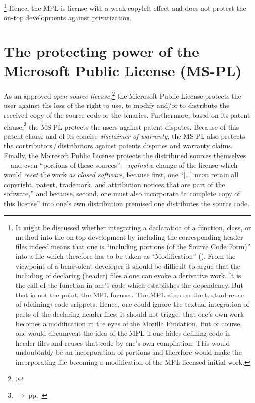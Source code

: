  \footnote{It might be discussed whether integrating a declaration of a
  function, class, or method into the on-top development by including the
  corresponding header files indeed means that one is \enquote{including
  portions (of the Source Code Form)} into a file which therefore has to be
  taken as \enquote{Modification} (\cite[cf.][\nopage
  wp.\ §1.4]{Mpl11MozFoundation2013a}). From the viewpoint of a benevolent
  developer it should be difficult to argue that the including of declaring
  (header) files alone can evoke a derivative work. It is the call of the
  function in one's code which establishes the dependency. But that is not the 
  point, the MPL focuses. The MPL aims on the textual reuse of (defining) code
  snippets. Hence, one could ignore the textual integration of parts of the
  declaring header files: it should not trigger that one's own work becomes a
  modification in the eyes of the Mozilla Findation. But of course, one would
  circumvent the idea of the MPL if one hides defining code in header files and
  reuses that code by one's own compilation. This would undoubtably be an
  incorporation of portions and therefore would make the incorporating file
  becoming a modification of the MPL licensed initial work.} 
Hence, the MPL is license with a weak copyleft effect and does not protect the
on-top developments against privatization.

\section{\texorpdfstring{The protecting power of the}{The} Microsoft Public License (MS-PL)}

As an approved \emph{open source license,}\footcite[cf.][\nopage wp]{OSI2012b}
the Microsoft Public License protects the user against the loss of the right to
use, to modify and/or to distribute the received copy of the source code or the
binaries. Furthermore, based on its patent
clause,\footnote{$\rightarrow$ \oslic{} pp.\ } the
MS-PL protects the users against patent disputes.
Because of this patent clause and of its 
concise \emph{disclaimer of warranty}, the MS-PL also protects the
contributors\,/\,distributors against patents disputes and warranty 
claims.
Finally, the Microsoft Public License protects the distributed sources
themselves---and even \enquote{portions of these sources}---\emph{against} a
change of the license which would \emph{reset} the work \emph{as closed
software}, because first, one \enquote{[\ldots] must retain all copyright,
patent, trademark, and attribution notices that are part of the
software,} and because, second, one must also incorporate
\enquote{a complete copy of this license} into one's own distribution premised
one distributes the source code.

